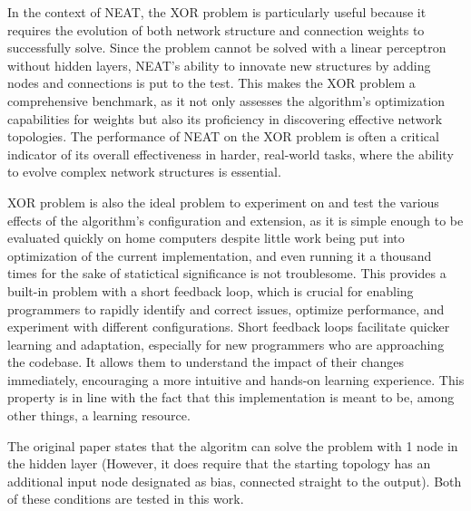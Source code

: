 \documentclass{article}
\begin{document}
        \par In the context of NEAT, the XOR problem is particularly useful because it requires the evolution
        of both network structure and connection weights to successfully solve. Since the problem cannot
        be solved with a linear perceptron without hidden layers, NEAT's ability to innovate new structures by adding nodes and
        connections is put to the test. This makes the XOR problem a comprehensive benchmark,
        as it not only assesses the algorithm's optimization capabilities for weights but also its proficiency in discovering
        effective network topologies. The performance of NEAT on the XOR problem is often a critical
        indicator of its overall effectiveness in harder, real-world tasks,
        where the ability to evolve complex network structures is essential.

        \par XOR problem is also the ideal problem to experiment on and test the various effects of the algorithm's configuration and extension,
        as it is simple enough to be evaluated quickly on home computers despite little work being put into optimization of the
        current implementation,
        and even running it a thousand times for the sake of statictical significance is not troublesome.
        This provides a built-in problem with a short feedback loop, which is crucial for 
        enabling programmers to rapidly identify and correct issues, optimize performance, and experiment with different configurations.
        Short feedback loops facilitate quicker learning and adaptation, especially for new programmers who are approaching the codebase.
        It allows them to understand the impact of their changes immediately, encouraging a more intuitive and hands-on learning experience.
        This property is in line with the fact that this implementation is meant to be, among other things, a learning resource.

        The original paper \cite{originalNeat}
        states that the algoritm can solve the problem with 1 node in the hidden layer (However,
        it does require that the starting topology has an additional input node designated
        as bias, connected straight to the output). Both of these conditions are tested in this work.
\end{document}
